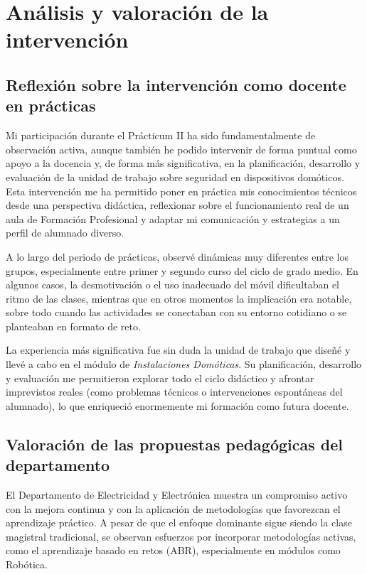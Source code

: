 \chapter{Análisis y valoración de la intervención}

\section{Reflexión sobre la intervención como docente en prácticas}

Mi participación durante el Prácticum II ha sido fundamentalmente de observación activa, aunque también he podido intervenir de forma puntual como apoyo a la docencia y, de forma más significativa, en la planificación, desarrollo y evaluación de la unidad de trabajo sobre seguridad en dispositivos domóticos. Esta intervención me ha permitido poner en práctica mis conocimientos técnicos desde una perspectiva didáctica, reflexionar sobre el funcionamiento real de un aula de Formación Profesional y adaptar mi comunicación y estrategias a un perfil de alumnado diverso.

A lo largo del periodo de prácticas, observé dinámicas muy diferentes entre los grupos, especialmente entre primer y segundo curso del ciclo de grado medio. En algunos casos, la desmotivación o el uso inadecuado del móvil dificultaban el ritmo de las clases, mientras que en otros momentos la implicación era notable, sobre todo cuando las actividades se conectaban con su entorno cotidiano o se planteaban en formato de reto.

La experiencia más significativa fue sin duda la unidad de trabajo que diseñé y llevé a cabo en el módulo de \textit{Instalaciones Domóticas}. Su planificación, desarrollo y evaluación me permitieron explorar todo el ciclo didáctico y afrontar imprevistos reales (como problemas técnicos o intervenciones espontáneas del alumnado), lo que enriqueció enormemente mi formación como futura docente.

\section{Valoración de las propuestas pedagógicas del departamento}

El Departamento de Electricidad y Electrónica muestra un compromiso activo con la mejora continua y con la aplicación de metodologías que favorezcan el aprendizaje práctico. A pesar de que el enfoque dominante sigue siendo la clase magistral tradicional, se observan esfuerzos por incorporar metodologías activas, como el aprendizaje basado en retos (ABR), especialmente en módulos como Robótica.

